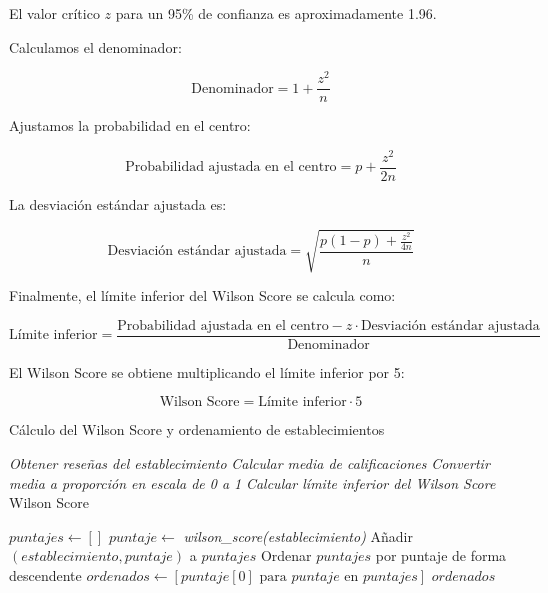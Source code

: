 El valor crítico $z$ para un 95\% de confianza es aproximadamente 1.96.

Calculamos el denominador:

\[
    \text{Denominador} = 1 + \frac{z^2}{n}
\]

Ajustamos la probabilidad en el centro:

\[
    \text{Probabilidad ajustada en el centro} = p + \frac{z^2}{2n}
\]

La desviación estándar ajustada es:

\[
    \text{Desviación estándar ajustada} = \sqrt{\frac{p(1-p) + \frac{z^2}{4n}}{n}}
\]

Finalmente, el límite inferior del Wilson Score se calcula como:

\[
    \text{Límite inferior} = \frac{\text{Probabilidad ajustada en el centro} - z \cdot \text{Desviación estándar ajustada}}{\text{Denominador}}
\]

El Wilson Score se obtiene multiplicando el límite inferior por 5:

\[
    \text{Wilson Score} = \text{Límite inferior} \cdot 5
\]

\clearpage
\begin{algorithm}
    \caption{Cálculo del Wilson Score y ordenamiento de establecimientos}
    \label{alg:wilson_score_ordenamiento}
    \begin{algorithmic}[1]

        \State \textit{Obtener reseñas del establecimiento}
        \State \textit{Calcular media de calificaciones}
        \State \textit{Convertir media a proporción en escala de 0 a 1}
        \State \textit{Calcular límite inferior del Wilson Score}
        \State \Return Wilson Score
        \EndFunction

        \State $puntajes \leftarrow []$
        \State $puntaje \leftarrow$ \textit{wilson\_score(establecimiento)}
        \State Añadir $(establecimiento, puntaje)$ a $puntajes$
        \EndFor
        \State Ordenar $puntajes$ por puntaje de forma descendente
        \State $ordenados \leftarrow [puntaje[0] \text{ para } puntaje \text{ en } puntajes]$
        \State \Return $ordenados$
        \EndFunction
    \end{algorithmic}
\end{algorithm}

